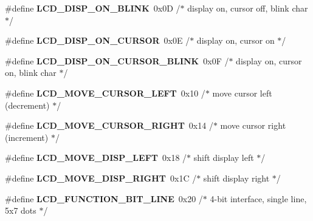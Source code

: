 \begin{DoxyCompactItemize}
\item 
\#define {\bfseries L\+C\+D\+\_\+\+D\+I\+S\+P\+\_\+\+O\+N\+\_\+\+B\+L\+I\+NK}~0x0\+D /$\ast$ display on, cursor off, blink char     $\ast$/\hypertarget{a00006_ga470cef85de53e37356b22c66a357a764}{}\label{a00006_ga470cef85de53e37356b22c66a357a764}

\item 
\#define {\bfseries L\+C\+D\+\_\+\+D\+I\+S\+P\+\_\+\+O\+N\+\_\+\+C\+U\+R\+S\+OR}~0x0\+E /$\ast$ display on, cursor on                  $\ast$/\hypertarget{a00006_gaf56b6d6bdb6fa48b26106dee5f74ae1f}{}\label{a00006_gaf56b6d6bdb6fa48b26106dee5f74ae1f}

\item 
\#define {\bfseries L\+C\+D\+\_\+\+D\+I\+S\+P\+\_\+\+O\+N\+\_\+\+C\+U\+R\+S\+O\+R\+\_\+\+B\+L\+I\+NK}~0x0\+F /$\ast$ display on, cursor on, blink char      $\ast$/\hypertarget{a00006_gac1984ed0db15c6991d34c184fdca5dc6}{}\label{a00006_gac1984ed0db15c6991d34c184fdca5dc6}

\item 
\#define {\bfseries L\+C\+D\+\_\+\+M\+O\+V\+E\+\_\+\+C\+U\+R\+S\+O\+R\+\_\+\+L\+E\+FT}~0x10 /$\ast$ move cursor left  (decrement)          $\ast$/\hypertarget{a00006_gac2f0ddce1daaa1bf1a016270a89a264b}{}\label{a00006_gac2f0ddce1daaa1bf1a016270a89a264b}

\item 
\#define {\bfseries L\+C\+D\+\_\+\+M\+O\+V\+E\+\_\+\+C\+U\+R\+S\+O\+R\+\_\+\+R\+I\+G\+HT}~0x14 /$\ast$ move cursor right (increment)          $\ast$/\hypertarget{a00006_ga0ad58e39e053e97d34527fcbe936899b}{}\label{a00006_ga0ad58e39e053e97d34527fcbe936899b}

\item 
\#define {\bfseries L\+C\+D\+\_\+\+M\+O\+V\+E\+\_\+\+D\+I\+S\+P\+\_\+\+L\+E\+FT}~0x18 /$\ast$ shift display left                     $\ast$/\hypertarget{a00006_gab3c34ff1eee238bbe9c677215219fb8e}{}\label{a00006_gab3c34ff1eee238bbe9c677215219fb8e}

\item 
\#define {\bfseries L\+C\+D\+\_\+\+M\+O\+V\+E\+\_\+\+D\+I\+S\+P\+\_\+\+R\+I\+G\+HT}~0x1\+C /$\ast$ shift display right                    $\ast$/\hypertarget{a00006_ga9a90bb926f5ba59378af81fe8e246ffb}{}\label{a00006_ga9a90bb926f5ba59378af81fe8e246ffb}

\item 
\#define {\bfseries L\+C\+D\+\_\+\+F\+U\+N\+C\+T\+I\+O\+N\+\_\+B\+I\+T\+\_\+L\+I\+NE}~0x20 /$\ast$ 4-\/bit interface, single line, 5x7 dots $\ast$/\hypertarget{a00006_gaff4e5baa36a0322eb97557dcb18cd96e}{}\label{a00006_gaff4e5baa36a0322eb97557dcb18cd96e}


\end{DoxyCompactItemize}
